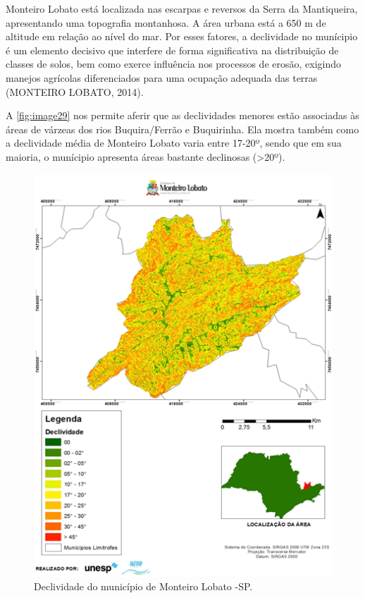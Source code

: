 Monteiro Lobato está localizada nas escarpas e reversos da Serra da Mantiqueira, apresentando uma topografia montanhosa. A área urbana está a 650 m de altitude em relação ao nível do mar. Por esses fatores, a declividade no munícipio é um elemento decisivo que interfere de forma significativa na distribuição de classes de solos, bem como exerce influência nos processos de erosão, exigindo manejos agrícolas diferenciados para uma ocupação adequada das terras (MONTEIRO LOBATO, 2014).

A \autoref{fig:image29} nos permite aferir que as declividades menores estão   associadas às áreas de várzeas dos rios Buquira/Ferrão e Buquirinha. Ela mostra também como a declividade média de Monteiro Lobato varia entre 17-20º, sendo que em sua maioria, o munícipio apresenta áreas bastante declinosas (>20º).
\clearpage
\begin{figure}[h]
	\centering
	\includegraphics[width=1\linewidth]{produtos/proddois/image29}
	\caption{Declividade do município de Monteiro Lobato -SP.}
	\label{fig:image29}
\end{figure}

